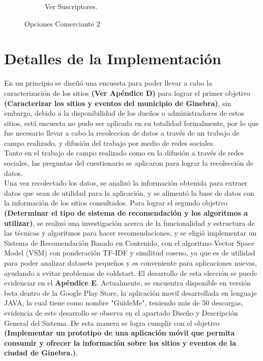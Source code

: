 \documentclass[12pt,letterpaper,openany]{book}
\begin{document}
\begin{figure}[H]
\begin{subfigure}{.4\linewidth}
        \caption{Ver Suscriptores.}
    \end{subfigure}
    \caption{Opciones Comerciante 2}
\end{figure}

\section{Detalles de la Implementación}
En un principio se diseñó una encuesta para poder llevar a cabo la caracterización de los sitios \textbf{(Ver Apéndice D)} para lograr el primer objetivo \textbf{(Caracterizar los sitios y eventos del municipio de Ginebra)}, sin embargo, debido a la disponibilidad de los dueños o administradores de estos sitios, está encuesta no pudo ser aplicada en su totalidad formalmente, por lo que fue necesario llevar a cabo la recoleccion de datos a través de un trabajo de campo realizado, y difusión del trabajo por medio de redes sociales.\\
Tanto en el trabajo de campo realizado como en la difusión a través de redes sociales, las preguntas del cuestionario se aplicaron para lograr la recolección de datos.\\
Una vez recolectado los datos, se analizó la información obtenida para extraer datos que sean de utilidad para la aplicación, y se alimentó la base de datos con la información de los sitios consultados.
\vspace{5mm}\newline
Para lograr el segundo objetivo \textbf{(Determinar el tipo de sistema de recomendación y los algoritmos a utilizar)}, se realizó una investigación acerca de la funcionalidad y estructura de las técnicas y algoritmos para hacer recomendaciones, y se eligió implementar un Sistema de Recomendación Basado en Contenido, con el algoritmo Vector Space Model (VSM) con ponderación TF-IDF y similitud coseno, ya que es de utilidad para poder analizar datasets pequeños y es conveniente para aplicaciones nuevas, ayudando a evitar problemas de coldstart. El desarrollo de esta elección se puede evidenciar en el \textbf{Apéndice E}.
\vspace{5mm}\newline
Actualmente, se encuentra disponible en versión beta dentro de la Google Play Store, la aplicación movil desarrollada en lenguaje JAVA, la cual tiene como nombre "GuideMe",  teniendo más de 50 descargas, evidencia de este desarrollo se observa en el apartado Diseño y Descripción General del Sistema. De esta manera se logra cumplir con el objetivo \textbf{(Implementar un prototipo de una aplicación móvil que permita consumir y ofrecer la información sobre los sitios y eventos de la ciudad de Ginebra.)}.
\end{document}
